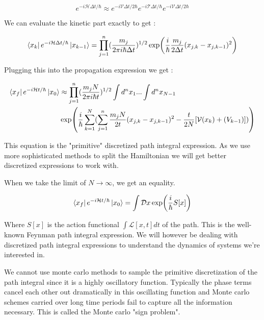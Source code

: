 \begin{equation}\label{4.x}
e^{-i\mathcal{H}\Delta t/\hbar} \approx e^{-i\mathcal{V}\Delta t/2\hbar}e^{-i\mathcal{T}\Delta t/\hbar}e^{-i\mathcal{V}\Delta t/2\hbar} 
\end{equation}

We can evaluate the kinetic part exactly to get :

\begin{equation} \label{4.x}
\bra{x_k}e^{-i\mathcal{H} \Delta t/\hbar}\ket{x_{k-1}} = \prod_{j=1}^{n} (\frac{m_j}{2\pi i \hbar \Delta t})^{1/2} \exp(\frac{i}{\hbar} \frac{m_j}{2\Delta t} (x_{j,k} - x_{j, k-1})^2)
\end{equation}

Plugging this into the propagation expression we get :

\begin{equation} \label{4.x}
    \begin{split}
        \bra{x_f} e^{-i\mathcal{H}t/\hbar} \ket{x_0} & \approx \prod_{j=1}^{n} (\frac{m_j N}{2\pi i \hbar t})^{1/2}  \int d^n x_1 ... \int d^n x_{N-1} \\ & \exp(\frac{i}{\hbar} \sum_{k=1}^{N} (\sum_{j=1}^{n} \frac{m_j N}{2t} (x_{j,k} - x_{j, k-1})^2 - \frac{t}{2N}[\mathcal{V}(x_k) + \mathcal(V_{k-1})]))
    \end{split}
\end{equation}

This equation is the "primitive" discretized path integral expression. As we use more sophisticated methods to split the Hamiltonian we will get better discretized expressions to work with.

When we take the limit of $N \to \infty$, we get an equality.  

\begin{equation}
    \bra{x_f} e^{-i\mathcal{H}t/\hbar}\ket{x_0} = \int \mathcal{D}x \exp(\frac{i}{\hbar} S[x])
\end{equation}

Where $S[x]$ is the action functional $\int \mathcal{L}[x, t] dt$ of the path. This is the well-known Feynman path integral expression. \cite{feynhibbs} We will however be dealing with discretized path integral expressions to understand the dynamics of systems we're interested in.

We cannot use monte carlo methods to sample the primitive discretization of the path integral since it is a highly oscillatory function. Typically the phase terms cancel each other out dramatically in this oscillating function and Monte carlo schemes carried over long time periods fail to capture all the information necessary. This is called the Monte carlo "sign problem".

